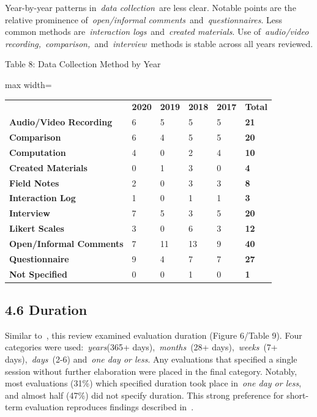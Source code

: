 \documentclass[sigconf]{nimeart}
\begin{document}
Year-by-year patterns in~\emph{data collection}~are less clear. Notable points are the relative prominence of~\emph{open/informal comments}~and~\emph{questionnaires}. Less common methods are~\emph{interaction logs}~and~\emph{created materials}. Use of~\emph{audio/video recording,}~\emph{comparison,~}and~\emph{interview}~methods is stable across all years reviewed.

Table 8: Data Collection Method by Year

{\def\LTcaptype{none} %
\begin{table}[htbp]\centering\small
\begin{adjustbox}{max width=\textwidth}\begin{tabular}{llllll}
\toprule\noalign{}
\midrule
 & \textbf{2020} & \textbf{2019} & \textbf{2018} & \textbf{2017} & \textbf{Total} \\
\textbf{Audio/Video Recording} & 6 & 5 & 5 & 5 & \textbf{21} \\
\textbf{Comparison} & 6 & 4 & 5 & 5 & \textbf{20} \\
\textbf{Computation} & 4 & 0 & 2 & 4 & \textbf{10} \\
\textbf{Created Materials} & 0 & 1 & 3 & 0 & \textbf{4} \\
\textbf{Field Notes} & 2 & 0 & 3 & 3 & \textbf{8} \\
\textbf{Interaction Log} & 1 & 0 & 1 & 1 & \textbf{3} \\
\textbf{Interview} & 7 & 5 & 3 & 5 & \textbf{20} \\
\textbf{Likert Scales} & 3 & 0 & 6 & 3 & \textbf{12} \\
\textbf{Open/Informal Comments} & 7 & 11 & 13 & 9 & \textbf{40} \\
\textbf{Questionnaire} & 9 & 4 & 7 & 7 & \textbf{27} \\
\textbf{Not Specified} & 0 & 0 & 1 & 0 & \textbf{1} \\
\bottomrule
\end{tabular}\end{adjustbox}\end{table}
}

\subsection{4.6 Duration}\label{duration}

Similar to~\cite{c2}, this review examined evaluation duration (Figure 6/Table 9). Four categories were used:~\emph{years}(365+ days),~\emph{months}~(28+ days),~\emph{weeks}~(7+ days),~\emph{days}~(2-6) and~\emph{one day or less}. Any evaluations that specified a single session without further elaboration were placed in the final category. Notably, most evaluations (31\%) which specified duration took place in~\emph{one day or less}, and almost half (47\%) did not specify duration. This strong preference for short-term evaluation reproduces findings described in~\cite{c2}.
\end{document}
